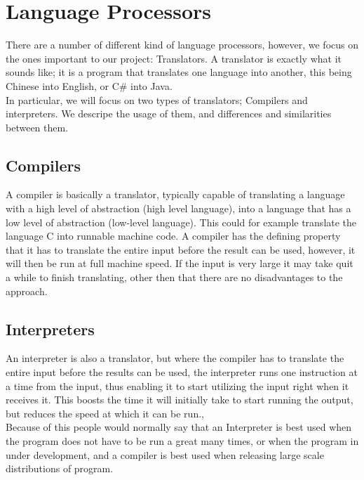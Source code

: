 \chapter{Language Processors}


There are a number of different kind of language processors, however, we focus on the ones important to our project: Translators. A translator is exactly what it sounds like; it is a program that translates one language into another, this being Chinese into English, or C\# into Java. \\ \indent 
   In particular, we will focus on two types of translators; Compilers and interpreters. We descripe the usage of them, and differences and similarities between them.

\section{Compilers}
A compiler is basically a translator, typically capable of translating a language with a high level of abstraction (high level language), into a language that has a low level of abstraction (low-level language). This could for example translate the language C into runnable machine code. A compiler has the defining property that it has to translate the entire input before the result can be used, however, it will then be run at full machine speed. If the input is very large it may take quit a while to finish translating, other then that there are no disadvantages to the approach.

\section{Interpreters}
An interpreter is also a translator, but where the compiler has to translate the entire input before the results can be used, the interpreter runs one instruction at a time from the input, thus enabling it to start utilizing the input right when it receives it. This boosts the time it will initially take to start running the output, but reduces the speed at which it can be run.,\\
\indent Because of this people would normally say that an Interpreter is best used when the program does not have to be run a great many times, or when the program in under development, and a compiler is best used when releasing large scale distributions of program.


